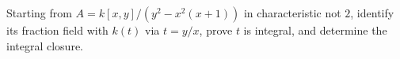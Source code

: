 \begin{problem}\label{chal:vi28-02}
Starting from $A=k[x,y]/(y^2-x^2(x+1))$ in characteristic not $2$, identify its fraction field with $k(t)$ via $t=y/x$, prove $t$ is integral, and determine the integral closure.
\end{problem}
